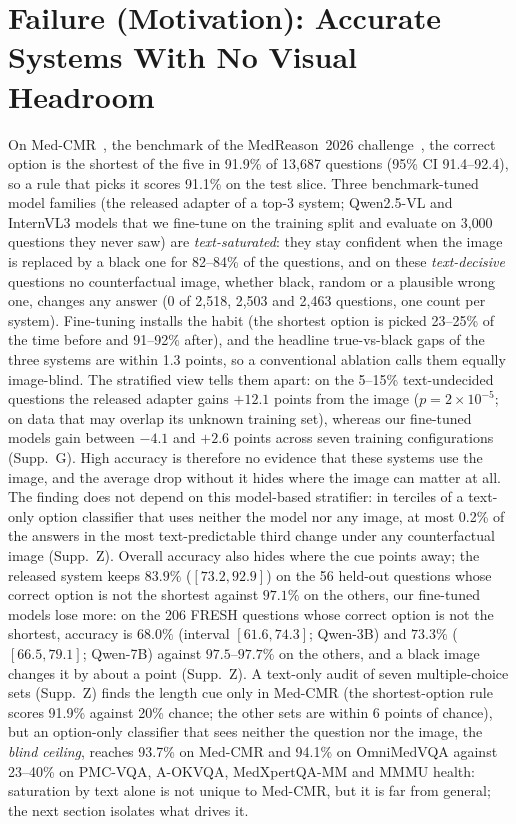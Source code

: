 \section{Failure (Motivation): Accurate Systems With No Visual Headroom}
\label{sec:obs}

On Med-CMR~\cite{gong2025medcmr}, the benchmark of the MedReason~2026 challenge~\cite{medreason2026}, the correct option is the shortest of the five in 91.9\% of 13{,}687 questions (95\% CI 91.4--92.4), so a rule that picks it scores 91.1\% on the test slice.
Three benchmark-tuned model families (the released adapter of a top-3 system; Qwen2.5-VL and InternVL3 models that we fine-tune on the training split and evaluate on 3{,}000 questions they never saw) are \emph{text-saturated}: they stay confident when the image is replaced by a black one for 82--84\% of the questions, and on these \emph{text-decisive} questions no counterfactual image, whether black, random or a plausible wrong one, changes any answer (0 of 2{,}518, 2{,}503 and 2{,}463 questions, one count per system).
Fine-tuning installs the habit (the shortest option is picked 23--25\% of the time before and 91--92\% after), and the headline true-vs-black gaps of the three systems are within 1.3 points, so a conventional ablation calls them equally image-blind.
The stratified view tells them apart: on the 5--15\% text-undecided questions the released adapter gains $+12.1$ points from the image ($p=2\times10^{-5}$; on data that may overlap its unknown training set), whereas our fine-tuned models gain between $-4.1$ and $+2.6$ points across seven training configurations (Supp.~G).
High accuracy is therefore no evidence that these systems use the image, and the average drop without it hides where the image can matter at all.
The finding does not depend on this model-based stratifier: in terciles of a text-only option classifier that uses neither the model nor any image, at most 0.2\% of the answers in the most text-predictable third change under any counterfactual image (Supp.~Z).
Overall accuracy also hides where the cue points away; the released system keeps $83.9\%$ ($[73.2,92.9]$) on the 56 held-out questions whose correct option is not the shortest against $97.1\%$ on the others, our fine-tuned models lose more: on the 206 FRESH questions whose correct option is not the shortest, accuracy is $68.0\%$ (interval $[61.6,74.3]$; Qwen-3B) and $73.3\%$ ($[66.5,79.1]$; Qwen-7B) against $97.5$--$97.7\%$ on the others, and a black image changes it by about a point (Supp.~Z).
A text-only audit of seven multiple-choice sets (Supp.~Z) finds the length cue only in Med-CMR (the shortest-option rule scores 91.9\% against 20\% chance; the other sets are within 6 points of chance), but an option-only classifier that sees neither the question nor the image, the \emph{blind ceiling}, reaches 93.7\% on Med-CMR and 94.1\% on OmniMedVQA against 23--40\% on PMC-VQA, A-OKVQA, MedXpertQA-MM and MMMU health: saturation by text alone is not unique to Med-CMR, but it is far from general; the next section isolates what drives it.
